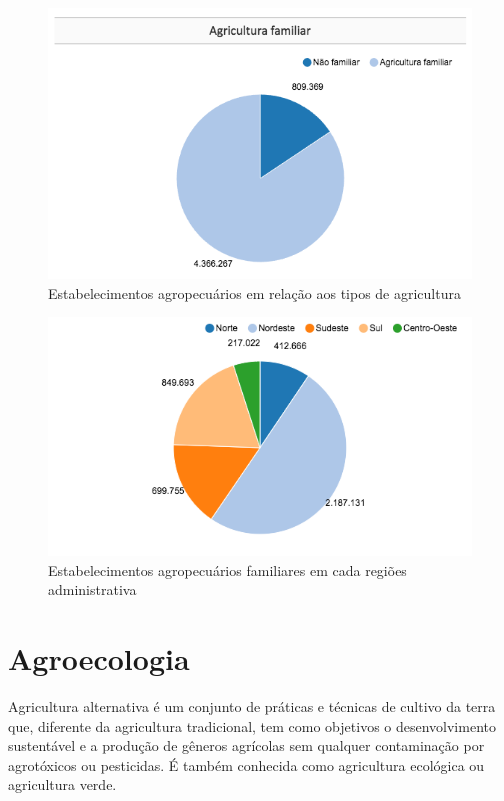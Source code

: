 \begin{figure}[tbh!]
	\centering
	\includegraphics[width=1.0\textwidth]{../images/agriculturaFamiliarTotal}
	\caption{Estabelecimentos agropecuários em relação aos tipos de agricultura}
	\label{fig:agriculturaFamiliarTotal}
\end{figure}

\begin{figure}[tbh!]
	\centering
	\includegraphics[width=1.0\textwidth]{../images/agriculturaFamiliarRegiao}
	\caption{Estabelecimentos agropecuários familiares em cada regiões administrativa}
	\label{fig:agriculturaFamiliarRegiao}
\end{figure}

\section{Agroecologia}
Agricultura alternativa é um conjunto de práticas e técnicas de cultivo da terra que, diferente da agricultura tradicional, tem como objetivos o desenvolvimento sustentável e a produção de gêneros agrícolas  sem qualquer contaminação por agrotóxicos ou pesticidas. É também conhecida como agricultura ecológica ou agricultura verde.

